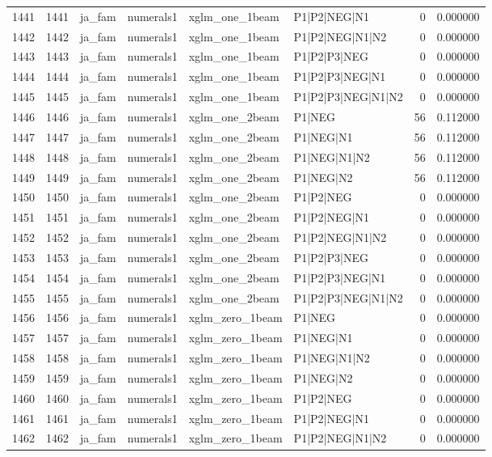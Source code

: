 \begin{tabular}{lrllllrr}
1441 & 1441 & ja_fam & numerals1 & xglm_one_1beam & P1|P2|NEG|N1 & 0 & 0.000000 \\
1442 & 1442 & ja_fam & numerals1 & xglm_one_1beam & P1|P2|NEG|N1|N2 & 0 & 0.000000 \\
1443 & 1443 & ja_fam & numerals1 & xglm_one_1beam & P1|P2|P3|NEG & 0 & 0.000000 \\
1444 & 1444 & ja_fam & numerals1 & xglm_one_1beam & P1|P2|P3|NEG|N1 & 0 & 0.000000 \\
1445 & 1445 & ja_fam & numerals1 & xglm_one_1beam & P1|P2|P3|NEG|N1|N2 & 0 & 0.000000 \\
1446 & 1446 & ja_fam & numerals1 & xglm_one_2beam & P1|NEG & 56 & 0.112000 \\
1447 & 1447 & ja_fam & numerals1 & xglm_one_2beam & P1|NEG|N1 & 56 & 0.112000 \\
1448 & 1448 & ja_fam & numerals1 & xglm_one_2beam & P1|NEG|N1|N2 & 56 & 0.112000 \\
1449 & 1449 & ja_fam & numerals1 & xglm_one_2beam & P1|NEG|N2 & 56 & 0.112000 \\
1450 & 1450 & ja_fam & numerals1 & xglm_one_2beam & P1|P2|NEG & 0 & 0.000000 \\
1451 & 1451 & ja_fam & numerals1 & xglm_one_2beam & P1|P2|NEG|N1 & 0 & 0.000000 \\
1452 & 1452 & ja_fam & numerals1 & xglm_one_2beam & P1|P2|NEG|N1|N2 & 0 & 0.000000 \\
1453 & 1453 & ja_fam & numerals1 & xglm_one_2beam & P1|P2|P3|NEG & 0 & 0.000000 \\
1454 & 1454 & ja_fam & numerals1 & xglm_one_2beam & P1|P2|P3|NEG|N1 & 0 & 0.000000 \\
1455 & 1455 & ja_fam & numerals1 & xglm_one_2beam & P1|P2|P3|NEG|N1|N2 & 0 & 0.000000 \\
1456 & 1456 & ja_fam & numerals1 & xglm_zero_1beam & P1|NEG & 0 & 0.000000 \\
1457 & 1457 & ja_fam & numerals1 & xglm_zero_1beam & P1|NEG|N1 & 0 & 0.000000 \\
1458 & 1458 & ja_fam & numerals1 & xglm_zero_1beam & P1|NEG|N1|N2 & 0 & 0.000000 \\
1459 & 1459 & ja_fam & numerals1 & xglm_zero_1beam & P1|NEG|N2 & 0 & 0.000000 \\
1460 & 1460 & ja_fam & numerals1 & xglm_zero_1beam & P1|P2|NEG & 0 & 0.000000 \\
1461 & 1461 & ja_fam & numerals1 & xglm_zero_1beam & P1|P2|NEG|N1 & 0 & 0.000000 \\
1462 & 1462 & ja_fam & numerals1 & xglm_zero_1beam & P1|P2|NEG|N1|N2 & 0 & 0.000000 \\

\end{tabular}
